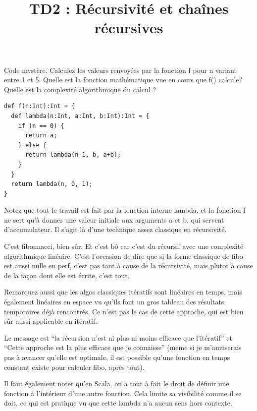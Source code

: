 \documentclass[10pt]{article}\usepackage[correction,nu]{esial}
\title{TD2 : Récursivité et chaînes récursives}
\begin{document}
\maketitle

\noindent\begin{minipage}{.5\linewidth}
\Exercice Code mystère.
\Question Calculez les valeurs renvoyées par la fonction f pour n variant entre
1 et 5. 
\Question Quelle est la fonction mathématique vue en cours que f() calcule?
\Question Quelle est la complexité algorithmique du calcul ? 
\end{minipage}\hfill\begin{minipage}{.49\linewidth}
\begin{Verbatim}[numbers=right]
def f(n:Int):Int = {
  def lambda(n:Int, a:Int, b:Int):Int = {
    if (n == 0) {
      return a;
    } else {
      return lambda(n-1, b, a+b);
    }
  }
  return lambda(n, 0, 1);
}  
\end{Verbatim}  
\end{minipage}\smallskip

Notez que tout le travail est fait par la fonction interne lambda, et la
fonction f ne sert qu'à donner une valeur initiale aux arguments a et b, qui
servent d'accumulateur. Il s'agit là d'une technique assez classique en
récursivité.

\begin{Reponse}
  C'est fibonnacci, bien sûr. Et c'est bô car c'est du récursif avec une
  complexité algorithmique linéaire. C'est l'occasion de dire que si la forme
  classique de fibo est aussi nulle en perf, c'est pas tant à cause de la
  récursivité, mais plutot à cause de la façon dont elle est écrite, c'est
  tout. 

  Remarquez aussi que les algos classiques itératifs sont linéaires en temps,
  mais également linéaires en espace vu qu'ils font un gros tableau des
  résultats temporaires déjà rencontrés. Ce n'est pas le cas de cette approche,
  qui est bien sûr aussi applicable en itératif.

  Le message est ``la récursion n'est ni plus ni moins efficace que
  l'itératif'' et ``Cette approche est la plus efficace que je connaisse''
  (meme si je m'amuserais pas à avancer qu'elle est optimale, il est possible
  qu'une fonction en temps constant existe pour calculer fibo, après tout).

  Il faut également noter qu'en Scala, on a tout à fait le droit de définir une
  fonction à l'intérieur d'une autre fonction. Cela limite sa visibilité comme
  il se doit, ce qui est pratique vu que cette lambda n'a aucun sens hors
  contexte.
\end{Reponse}
\end{document}
